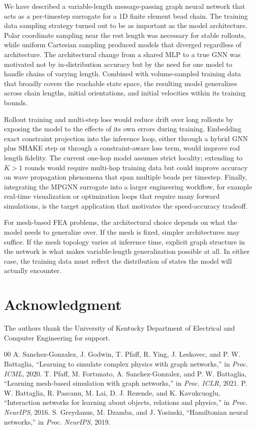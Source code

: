 \documentclass[conference]{IEEEtran}
\begin{document}
We have described a variable-length message-passing graph neural network that acts as a per-timestep surrogate for a 1D finite element bead chain. The training data sampling strategy turned out to be as important as the model architecture. Polar coordinate sampling near the rest length was necessary for stable rollouts, while uniform Cartesian sampling produced models that diverged regardless of architecture. The architectural change from a shared MLP to a true GNN was motivated not by in-distribution accuracy but by the need for one model to handle chains of varying length. Combined with volume-sampled training data that broadly covers the reachable state space, the resulting model generalizes across chain lengths, initial orientations, and initial velocities within its training bounds.

Rollout training and multi-step loss would reduce drift over long rollouts by exposing the model to the effects of its own errors during training. Embedding exact constraint projection into the inference loop, either through a hybrid GNN plus SHAKE step or through a constraint-aware loss term, would improve rod length fidelity. The current one-hop model assumes strict locality; extending to $K > 1$ rounds would require multi-hop training data but could improve accuracy on wave propagation phenomena that span multiple beads per timestep. Finally, integrating the MPGNN surrogate into a larger engineering workflow, for example real-time visualization or optimization loops that require many forward simulations, is the target application that motivates the speed-accuracy tradeoff.

For mesh-based FEA problems, the architectural choice depends on what the model needs to generalize over. If the mesh is fixed, simpler architectures may suffice. If the mesh topology varies at inference time, explicit graph structure in the network is what makes variable-length generalization possible at all. In either case, the training data must reflect the distribution of states the model will actually encounter.

\section*{Acknowledgment}

The authors thank the University of Kentucky Department of Electrical and Computer Engineering for support.

\begin{thebibliography}{00}
 A. Sanchez-Gonzalez, J. Godwin, T. Pfaff, R. Ying, J. Leskovec, and P. W. Battaglia, ``Learning to simulate complex physics with graph networks,'' in \emph{Proc. ICML}, 2020.
 T. Pfaff, M. Fortunato, A. Sanchez-Gonzalez, and P. W. Battaglia, ``Learning mesh-based simulation with graph networks,'' in \emph{Proc. ICLR}, 2021.
 P. W. Battaglia, R. Pascanu, M. Lai, D. J. Rezende, and K. Kavukcuoglu, ``Interaction networks for learning about objects, relations and physics,'' in \emph{Proc. NeurIPS}, 2016.
 S. Greydanus, M. Dzamba, and J. Yosinski, ``Hamiltonian neural networks,'' in \emph{Proc. NeurIPS}, 2019.
\end{thebibliography}
\end{document}
